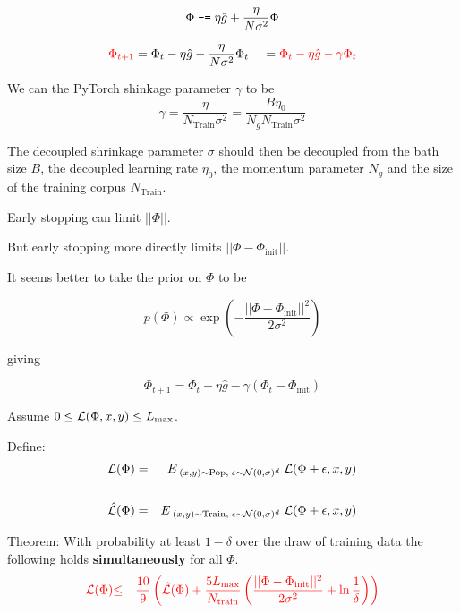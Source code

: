{\vfill
{\color{red} $$\Phi \;\mbox{\tt -=}\; \eta\hat{g} +\frac{\eta}{N\sigma^2}\Phi$$}


$${\color{red} \Phi_{t+1}} = \Phi_t - \eta\hat{g} - \frac{\eta}{N\sigma^2}\Phi_t\;\;\;\; = {\color{red} \Phi_t - \eta\hat{g} - \gamma\Phi_t}$$

\vfill
We can the PyTorch shinkage parameter $\gamma$ to be 
\vfill
{\color{red} $$\gamma = \frac{\eta}{N_{\mathrm{Train}}\sigma^2} = \frac{B\eta_0}{N_gN_{\mathrm{Train}}\sigma^2}$$}

\vfill
The decoupled shrinkage parameter $\sigma$ should then be decoupled from the bath size $B$, the decoupled learning rate $\eta_0$, the momentum parameter $N_g$ and
the size of the training corpus $N_{\mathrm{Train}}$.


Early stopping can limit $||\Phi||$.

\vfill
But early stopping more directly limits $||\Phi - \Phi_\mathrm{init}||$.

\vfill
It seems better to take the prior on $\Phi$ to be

\vfill
{\color{red} $$p(\Phi) \propto \exp\left(-\frac{||\Phi - \Phi_{\mathrm{init}}||^2}{2\sigma^2}\right)$$}

\vfill
giving

\vfill
$$\Phi_{t+1} = \Phi_t - \eta\hat{g} - \gamma(\Phi_t - \Phi_{\mathrm{init}})$$


Assume $0 \leq {\cal L}(\Phi,x,y) \leq L_{\max}$.

\vfill
Define:
\begin{eqnarray*}
{\cal L}(\Phi) & = & E_{\;(x,y)\sim \mathrm{Pop},\;\epsilon \sim {\cal N}(0,\sigma)^d}\;{{\cal L}(\Phi+\epsilon,x,y)} \\
\\
\hat{{\cal L}}(\Phi) & = & E_{\;(x,y)\sim \mathrm{Train},\;\epsilon \sim {\cal N}(0,\sigma)^d}\;{{\cal L}(\Phi+\epsilon,x,y)} \\
\end{eqnarray*}

\vfill
Theorem: With probability at least $1-\delta$ over the draw of training data the following holds {\bf simultaneously} for all $\Phi$.
\begin{eqnarray*}
   {\color{red} {\cal L}(\Phi)} & {\color{red} \leq} & {\color{red} \frac{10}{9}\left(\hat{{\cal L}}(\Phi)
   + \frac{5 L_{\max}}{N_{\mathrm{train}}}\left(\frac{||\Phi-\Phi_{\mathrm{init}}||^2}{2\sigma^2} + \ln \frac{1}{\delta}\right)\right)}
\end{eqnarray*}


}

